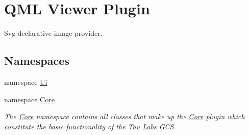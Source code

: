 \hypertarget{group___o_p_map_plugin}{\section{Q\-M\-L Viewer Plugin}
\label{group___o_p_map_plugin}
}


Svg declarative image provider.  


\subsection*{Namespaces}
\begin{DoxyCompactItemize}
\item 
namespace \hyperlink{namespace_ui}{Ui}
\item 
namespace \hyperlink{namespace_core}{Core}
\begin{DoxyCompactList}\small\item\em The \hyperlink{namespace_core}{Core} namespace contains all classes that make up the \hyperlink{namespace_core}{Core} plugin which constitute the basic functionality of the Tau Labs G\-C\-S. \end{DoxyCompactList}\end{DoxyCompactItemize}
